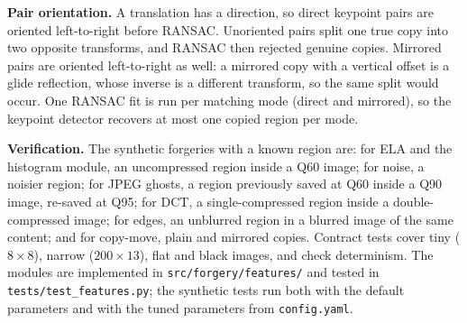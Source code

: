 \textbf{Pair orientation.} A translation has a direction, so direct keypoint pairs are oriented left-to-right
before RANSAC. Unoriented pairs split one true copy into two opposite transforms, and RANSAC then rejected genuine
copies. Mirrored pairs are oriented left-to-right as well: a mirrored copy with a vertical offset is a glide
reflection, whose inverse is a different transform, so the same split would occur. One RANSAC fit is run per
matching mode (direct and mirrored), so the keypoint detector recovers at most one copied region per mode.

\textbf{Verification.} The synthetic forgeries with a known region are: for ELA and the histogram module, an
uncompressed region inside a Q60 image; for noise, a noisier region; for JPEG ghosts, a region previously saved at
Q60 inside a Q90 image, re-saved at Q95; for DCT, a single-compressed region inside a double-compressed image; for
edges, an unblurred region in a blurred image of the same content; and for copy-move, plain and mirrored copies.
Contract tests cover tiny ($8\times8$), narrow ($200\times13$), flat and black images, and check determinism. The
modules are implemented in \texttt{src/forgery/features/} and tested in \texttt{tests/test\_features.py}; the
synthetic tests run both with the default parameters and with the tuned parameters from \texttt{config.yaml}.
